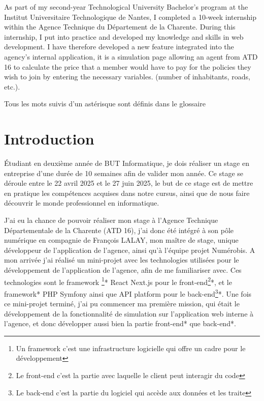 \documentclass[a4paper,12pt]{report}
\begin{document}
As part of my second-year Technological University Bachelor’s program at the Institut Universitaire Technologique de Nantes, I completed a 10-week internship within the Agence Technique du Département de la Charente. During this internship, I put into practice and developed my knowledge and skills in web development. I have therefore developed a new feature integrated into the agency’s internal application, it is a simulation page allowing an agent from ATD 16 to calculate the price that a member would have to pay for the policies they wish to join by entering the necessary variables. (number of inhabitants, roads, etc.).

\tableofcontents               

\newpage
\thispagestyle{empty}
\vspace*{\fill}            
\begin{center}             
Tous les mots suivis d'un astérisque sont définis dans le glossaire
\end{center}
\vspace*{\fill}            


\chapter{Introduction}         
Étudiant en deuxième année de BUT Informatique, je dois réaliser un stage en entreprise d'une durée de 10 semaines afin de valider mon année. Ce stage se déroule entre le 22 avril 2025 et le 27 juin 2025, le but de ce stage est de mettre en pratique les compétences acquises dans notre cursus, ainsi que de nous faire découvrir le monde professionnel en informatique.

\vspace{1em}

J'ai eu la chance de pouvoir réaliser mon stage à l'Agence Technique Départementale de la Charente (ATD 16), j'ai donc été intégré à son pôle numérique en compagnie de François LALAY, mon maître de stage, unique développeur de l'application de l'agence, ainsi qu'à l'équipe projet Numérobis. A mon arrivée j'ai réalisé un mini-projet avec les technologies utilisées pour le développement de l'application de l'agence, afin de me familiariser avec. Ces technologies sont le framework \footnote{Un framework c'est une infrastructure logicielle qui offre un cadre pour le développement}* React Next.js pour le front-end\footnote{Le front-end c'est la partie avec laquelle le client peut interagir du code}*, et le framework* PHP Symfony ainsi que API platform pour le back-end\footnote{Le back-end c'est la partie du logiciel qui accède aux données et les traite}*. Une fois ce mini-projet terminé, j'ai pu commencer ma première mission, qui était le développement de la fonctionnalité de simulation sur l'application web interne à l'agence, et donc développer aussi bien la partie front-end* que back-end*.
\end{document}
